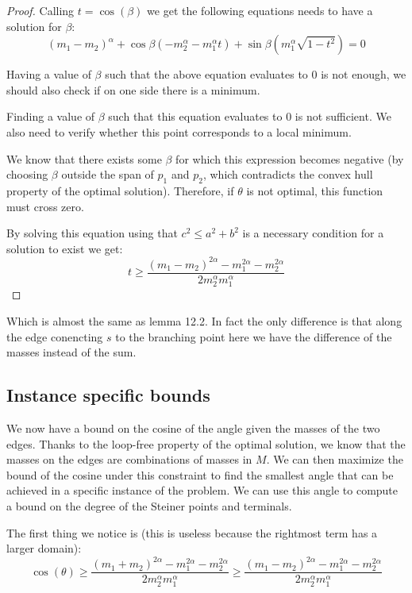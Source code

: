 \documentclass{article}
\begin{document}
\begin{proof}
        Calling $t = \cos(\beta)$ we get the following equations needs to have a solution for $\beta$:
        \begin{equation}
        (m_1-m_2)
            ^{\alpha} + \cos\beta(-m_2^\alpha-m_1^\alpha t) + \sin\beta(m_1^\alpha \sqrt{1-t^2}) = 0
        \end{equation}

        Having a value of $\beta$ such that the above equation evaluates to 0 is not enough, we should also check if on one side there is
        a minimum.

        Finding a value of $\beta$ such that this equation evaluates to 0 is not sufficient.
        We also need to verify whether this point corresponds to a local minimum.

        We know that there exists some $\beta$ for which this expression becomes negative (by choosing $\beta$ outside the
        span of $p_1$ and $p_2$, which contradicts the convex hull property of the optimal solution). Therefore, if $\theta$
        is not optimal, this function must cross zero.


        By solving this equation using that $c^2 \le a^2 + b^2$ is a necessary condition for a solution to exist we get:
        \begin{equation}
            t \ge \frac{(m_1-m_2)^{2\alpha} - m_1^{2\alpha} - m_2^{2\alpha}}{2m_2^\alpha m_1^\alpha}
        \end{equation}
    \end{proof}


    Which is almost the same as lemma 12.2. In fact the only difference is that along the edge conencting $s$ to the
    branching point here we have the difference of the masses instead of the sum.

    \subsection{Instance specific bounds}

    We now have a bound on the cosine of the angle given the masses of the two edges. Thanks to the loop-free property of the optimal solution,
    we know that the masses on the edges are combinations of masses in $M$. We can then maximize the bound of the cosine
    under this constraint to find the smallest angle that can be achieved in a specific instance of the problem. We can
    use this angle to compute a bound on the degree of the Steiner points and terminals.

    The first thing we notice is (this is useless because the rightmost term has a larger domain):
    \begin{equation}
        \cos(\theta) \ge \frac{(m_1+m_2)^{2\alpha} - m_1^{2\alpha} - m_2^{2\alpha}}{2m_2^\alpha m_1^\alpha} \ge \frac{(m_1-m_2)^{2\alpha} - m_1^{2\alpha} - m_2^{2\alpha}}{2m_2^\alpha m_1^\alpha}
    \end{equation}
\end{document}
